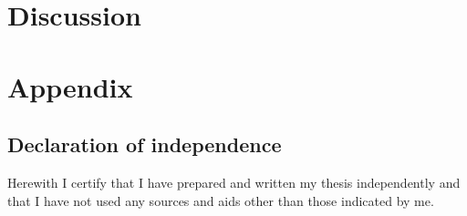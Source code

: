 \documentclass[man]{apa7}
\begin{document}
\section{Discussion}

\printbibliography
\newpage
\section{Appendix}

\subsection{Declaration of independence}

Herewith I certify that I have prepared and written my thesis independently and that I have not used any sources and aids other than those indicated by me.
\end{document}
